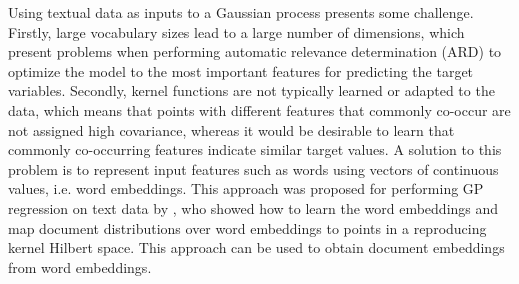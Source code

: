 Using textual data as inputs to a Gaussian process presents some challenge. 
Firstly, large vocabulary sizes lead to a large number of dimensions, which present problems
when performing automatic relevance determination (ARD) to optimize the model to the most important
features for predicting the target variables. Secondly, kernel functions are not typically learned
or adapted to the data, which means that points with different features that commonly co-occur are
not assigned high covariance, whereas it would be desirable to learn that commonly co-occurring features
indicate similar target values. 
A solution to this problem is to represent input features such as words using vectors of continuous values, i.e. word embeddings. This approach was proposed for performing GP regression on 
text data by \cite{yoshikawa2015non}, who showed how to learn the word embeddings and map document
distributions over word embeddings to points in a reproducing kernel Hilbert space. 
This approach can be used to obtain document embeddings from word embeddings.


